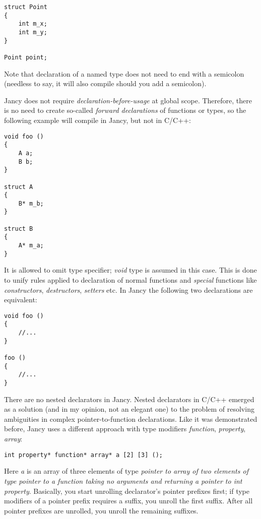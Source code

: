 \documentclass[oneside]{book}
\begin{document}
\begin{lstlisting}
struct Point
{
	int m_x;
	int m_y;
} 

Point point;
\end{lstlisting}

Note that declaration of a named type does not need to end with a semicolon (needless to say, it will also compile should you add a semicolon).

Jancy does not require \emph{declaration-before-usage} at global scope. Therefore, there is no need to create so-called \emph{forward declarations} of functions or types, so the following example will compile in Jancy, but not in C/C++:

\begin{lstlisting}
void foo ()
{
	A a;
	B b;
}

struct A
{
	B* m_b;
}

struct B
{
	A* m_a;
}
\end{lstlisting}

It is allowed to omit type specifier; \emph{void} type is assumed in this case. This is done to unify rules applied to declaration of normal functions and \emph{special} functions like \emph{constructors}, \emph{destructors}, \emph{setters} etc. In Jancy the following two declarations are equivalent:

\begin{lstlisting}
void foo ()
{
	//...
}

foo ()
{
	//...
}
\end{lstlisting}

There are no nested declarators in Jancy. Nested declarators in C/C++ emerged as a solution (and in my opinion, not an elegant one) to the problem of resolving ambiguities in complex pointer-to-function declarations. Like it was demonstrated before, Jancy uses a different approach with type modifiers \emph{function}, \emph{property}, \emph{array}:

\begin{lstlisting}
int property* function* array* a [2] [3] ();
\end{lstlisting}

Here \emph{a} is an array of three elements of type \emph{pointer to array of two elements of type pointer to a function taking no arguments and returning a pointer to int property}. Basically, you start unrolling declarator's pointer prefixes first; if type modifiers of a pointer prefix requires a suffix, you unroll the first suffix. After all pointer prefixes are unrolled, you unroll the remaining suffixes. 
\end{document}
